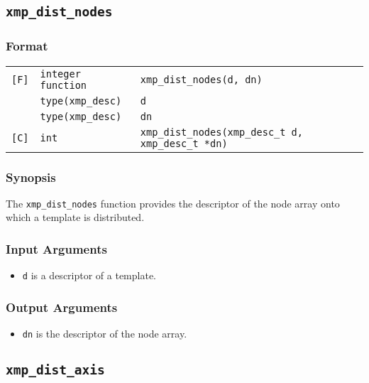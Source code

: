 \subsection{\tt xmp\_dist\_nodes}

\subsubsection*{Format}

\begin{tabular}{lll}

\verb![F]!& {\tt integer function}& {\tt xmp\_dist\_nodes(d, dn)}\\
          & {\tt type(xmp\_desc)} & {\tt d}\\
          & {\tt type(xmp\_desc)} & {\tt dn}\\

\verb![C]!&  {\tt int}& {\tt xmp\_dist\_nodes(xmp\_desc\_t d, xmp\_desc\_t *dn)}\\

\end{tabular}

\subsubsection*{Synopsis}

The {\tt xmp\_dist\_nodes} function provides the descriptor of the node
array onto which a template is distributed.


\subsubsection*{Input Arguments}
\begin{itemize}
 \item {\tt d} is a descriptor of a template.
\end{itemize}

\subsubsection*{Output Arguments}
\begin{itemize}
 \item {\tt dn} is the descriptor of the node array.
\end{itemize}


\subsection{\tt xmp\_dist\_axis}


